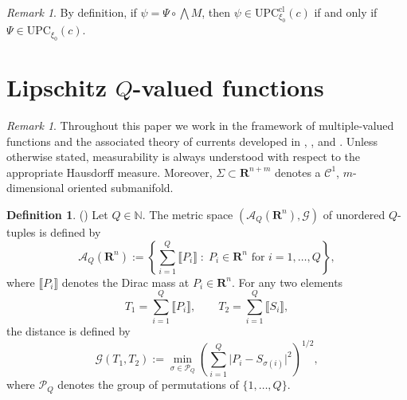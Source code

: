 \documentclass[a4paper,twoside,reqno]{article}
\theoremstyle{definition}
\theoremstyle{remark}
\theoremstyle{plain}
\theoremstyle{remark}
\newtheorem{remark}[theorem]{Remark}
\theoremstyle{definition}
\newtheorem{definition}[theorem]{Definition}
\newcommand{\natp}{\mathbb{N}}
\newcommand{\UPC}{\mathrm{UPC}}
\newcommand{\R}{\mathbf{R}}
\newcommand{\tbwedge}{{\textstyle \boldsymbol{\bigwedge}}}
\newcommand{\cnt}[1]{\mathscr{C}^{#1}}
\newcommand{\qspace}[1]{\mathcal{A}_{{#1}}}
\begin{document}
\begin{remark}\label{rem:class_geom_poly_equivalence}
    By definition, if $\psi = \Psi \circ \tbwedge M$, then 
    $\psi \in \UPC^{\text{cl}}_{\xi_0}(c)$ if and only if 
    $\Psi \in \UPC_{\xi_0}(c)$.
\end{remark}

\section{Lipschitz $Q$-valued functions}\label{section:q_valued_functions}

\begin{remark}
    Throughout this paper we work in the framework of multiple-valued functions
    and the associated theory of currents developed in
    \cite{delellis2013multiplevaluedfunctionsintegral},
    \cite{De_Lellis_2011_Q_valued_functions_revisited},
    and \cite{DeLellis2011a}.
    Unless otherwise stated, measurability is always understood with respect to 
    the appropriate Hausdorff measure. Moreover, $\Sigma \subset \R^{n+m}$ 
    denotes a $\cnt{1}$, $m$-dimensional oriented submanifold.
\end{remark}

\begin{definition}(\cite[1.1]{DeLellis2011a})
    Let $Q \in \natp$. The metric space
    $(\qspace{Q}(\R^n), \mathcal{G})$ of unordered $Q$-tuples is defined by
    \[
        \qspace{Q}(\R^n)
        :=
        \left\{
        \sum_{i=1}^Q \llbracket P_i \rrbracket
        \;:\;
        P_i \in \R^n \text{ for } i = 1,\dots,Q
        \right\},
    \]
    where $\llbracket P_i \rrbracket$ denotes the Dirac mass at
    $P_i \in \R^n$.
    For any two elements
    \[
        T_1 = \sum_{i=1}^Q \llbracket P_i \rrbracket,
        \qquad
        T_2 = \sum_{i=1}^Q \llbracket S_i \rrbracket,
    \]
    the distance is defined by
    \[
        \mathcal{G}(T_1,T_2)
        :=
        \min_{\sigma \in \mathcal{P}_Q}
        \left(
        \sum_{i=1}^Q \lvert P_i - S_{\sigma(i)} \rvert^2
        \right)^{1/2},
    \]
    where $\mathcal{P}_Q$ denotes the group of permutations of $\{1,\dots,Q\}$.
\end{definition}
\end{document}
